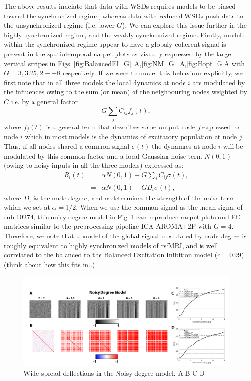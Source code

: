 \documentclass[oneside]{zHenriquesLab-StyleBioRxiv}
\begin{document}
The above results indciate that data with WSDs requires models to be biased toward the synchronized regime, whereas data with reduced WSDs push data to the unsynchronized regime (i.e. lower $G$). We can explore this issue further in the highly synchronized regime, and the weakly synchronized regime. Firstly, models within the synchronized regime appear to have a globaly coherent signal is present in the spatiotemporal carpet plots as visually expressed by the large vertical stripes in Figs~\ref{fig:BalancedEI_G}~A,\ref{fig:NM_G}~A,\ref{fig:Hopf_G}A with $G=3,3.25,2--8$ respecively. If we were to model this behaviour explicitly, we first note that in all three models the local dynamics at node $i$ are modulated by the influences owing to the sum (or mean) of the neighbouring nodes weighted by $C$ i.e. by a general factor
\begin{equation}
G\sum_jC_{ij}f_{j}(t),
\end{equation}
where $f_{j}(t)$ is a general term that describes some output node $j$ expressed to node $i$ which in most models is the dynamics of excitatory population at node $j$. Thus, if all nodes shared a common signal $\sigma(t)$ the dynamics at node $i$ will be modulated by this common factor and a local Gaussian noise term $N(0,1)$ (owing to noisy inputs in all the three models) expressed as:
\begin{eqnarray}
B_i(t) &=& \alpha N(0,1) + G\sum_jC_{ij}\sigma(t),\\
	   &=& \alpha N(0,1) + GD_{i}\sigma(t),
\end{eqnarray}
where $D_i$ is the node degree, and $\alpha$ determines the strength of the noise term which we set at $\alpha=1/2$. When we use the common signal as the mean signal of sub-10274, this noisy degree model in Fig~\ref{fig:NDM_G} can reproduce carpet plots and FC matrices similar to the preprocessing pipeline ICA-AROMA+2P with $G=4$. Therefore, we note that a model of the global signal modulated by node degree is roughly equivalent to highly synchronized models of rsfMRI, and is well correlated  to the balanced to the Balanced Excitation Inibition model ($r=0.99$). (think about how this fits in..)

\begin{figure}[ht!]
\includegraphics[width=1\textwidth]{figs/NDMModel.png}
\caption{Wide spread deflections in the Noisy degree model. A B C D}\label{fig:NDM_G}
\end{figure}
\end{document}
